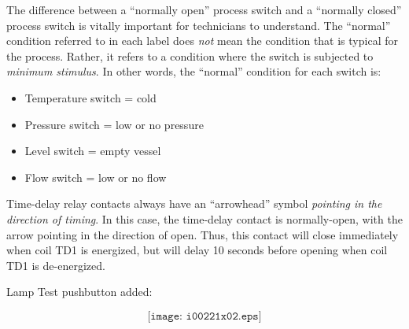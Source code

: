 \vskip 10pt

The difference between a ``normally open'' process switch and a ``normally closed'' process switch is vitally important for technicians to understand.  The ``normal'' condition referred to in each label does {\it not} mean the condition that is typical for the process.  Rather, it refers to a condition where the switch is subjected to {\it minimum stimulus}.  In other words, the ``normal'' condition for each switch is:

\begin{itemize}
\item{} Temperature switch = cold
\item{} Pressure switch = low or no pressure
\item{} Level switch = empty vessel
\item{} Flow switch = low or no flow
\end{itemize}







Time-delay relay contacts always have an ``arrowhead'' symbol {\it pointing in the direction of timing}.  In this case, the time-delay contact is normally-open, with the arrow pointing in the direction of open.  Thus, this contact will close immediately when coil TD1 is energized, but will delay 10 seconds before opening when coil TD1 is de-energized.

\vskip 10pt

Lamp Test pushbutton added:

$$\texttt{[image: i00221x02.eps]}$$




